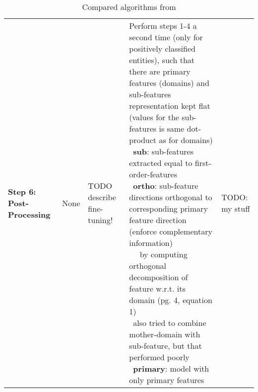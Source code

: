 {\begin{landscape}
\begin{table}[]
{\begin{tabular}{lllll}
			\textbf{Step 6: Post-Processing} 
			&                   
			None 
			&                 
			TODO describe fine-tuning! 
			& 
			\specialcell[l]{
				Perform steps 1-4 a second time (only for positively classified entities), such that there are primary features (domains) and sub-features \\ representation kept flat (values for the sub-features is same dot-product as for domains) \\ \textbullet\, \textbf{sub}: sub-features extracted equal to first-order-features \\ \textbullet\, \textbf{ortho}: sub-feature directions orthogonal to corresponding primary feature direction (enforce complementary information) \\ ~~ by computing orthogonal decomposition of feature w.r.t. its domain (pg. 4, equation 1) \\ \textbullet\, also tried to combine mother-domain with sub-feature, but that performed poorly \\ \textbullet\, \textbf{primary}: model with only primary features}
			&
			TODO: my stuff
			\end{tabular}
		}
		\caption{Compared algorithms from \mainalgos}
		\label{tab:compared_algos}
	\end{table}
\end{landscape}



} %
\restoregeometry